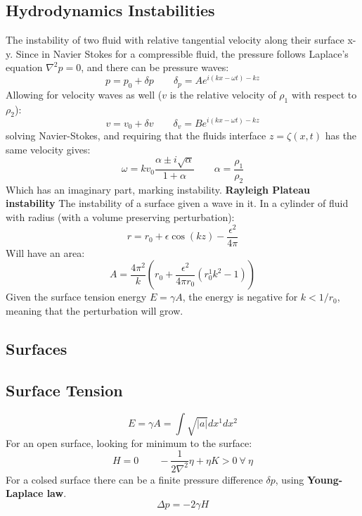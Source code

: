 \documentclass[twocolumn]{article}
\begin{document}
\subsection{Hydrodynamics Instabilities}
The instability of two fluid with relative tangential velocity along their surface x-y. Since in Navier Stokes for a compressible fluid, the pressure follows Laplace's equation $\nabla^2p = 0$, and there can be pressure waves:
\begin{equation}
    p = p_0 + \delta p \qquad \delta_p = Ae^{i(kx - \omega t) - kz}
\end{equation}
Allowing for velocity waves as well ($v$ is the relative velocity of $\rho_1$ with respect to $\rho_2$):
\begin{equation}
    v = v_0 + \delta v \qquad \delta_v = Be^{i(kx - \omega t) - kz}
\end{equation}
solving Navier-Stokes, and requiring that the fluids interface $z = \zeta(x, t)$ has the same velocity gives:
\begin{equation}
    \omega = kv_0\frac{\alpha \pm i\sqrt{\alpha}}{1 + \alpha} \qquad \alpha = \frac{\rho_1}{\rho_2}
\end{equation}
Which has an imaginary part, marking instability.
\newline
\textbf{Rayleigh Plateau instability}
\newline
The instability of a surface given a wave in it. In a cylinder of fluid with radius (with a volume preserving perturbation):
\begin{equation}
    r = r_0 + \epsilon \cos(kz) - \frac{\epsilon^2}{4\pi}
\end{equation}
Will have an area:
\begin{equation}
    A = \frac{4\pi^2}{k}\left(r_0 + \frac{\epsilon^2}{4\pi r_0}\left(r_0^1k^2 - 1\right)\right)
\end{equation}
Given the surface tension energy $E = \gamma A$, the energy is negative for $k < 1/r_0$, meaning that the perturbation will grow.
\subsection{Surfaces}
\subsection{Surface Tension}
\begin{equation}
    E = \gamma A = \int \sqrt{|a|}dx^1dx^2
\end{equation}
For an open surface, looking for minimum to the surface:
\begin{equation}
    H = 0
    \qquad
    -\frac{1}{2\nabla^2}\eta + \eta K > 0 \ \forall \ \eta
\end{equation}
For a colsed surface there can be a finite pressure difference $\delta p$, using \textbf{Young-Laplace law}.
\begin{equation}
    \Delta p = -2\gamma H
\end{equation}
\end{document}
